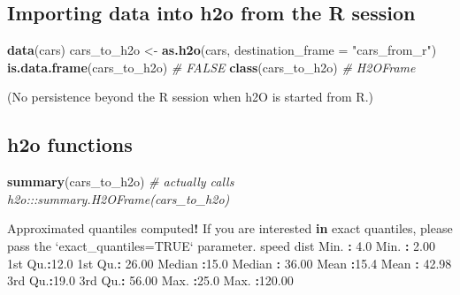 \documentclass[]{book}
\newenvironment{Shaded}{\begin{snugshade}}{\end{snugshade}}
\newcommand{\KeywordTok}[1]{\textcolor[rgb]{0.13,0.29,0.53}{\textbf{#1}}}
\newcommand{\DataTypeTok}[1]{\textcolor[rgb]{0.13,0.29,0.53}{#1}}
\newcommand{\FloatTok}[1]{\textcolor[rgb]{0.00,0.00,0.81}{#1}}
\newcommand{\StringTok}[1]{\textcolor[rgb]{0.31,0.60,0.02}{#1}}
\newcommand{\CommentTok}[1]{\textcolor[rgb]{0.56,0.35,0.01}{\textit{#1}}}
\newcommand{\ControlFlowTok}[1]{\textcolor[rgb]{0.13,0.29,0.53}{\textbf{#1}}}
\newcommand{\OperatorTok}[1]{\textcolor[rgb]{0.81,0.36,0.00}{\textbf{#1}}}
\newcommand{\NormalTok}[1]{#1}
\theoremstyle{definition}
\theoremstyle{definition}
\theoremstyle{definition}
\theoremstyle{remark}
\begin{document}
\subsection{Importing data into h2o from the R
session}\label{importing-data-into-h2o-from-the-r-session}

\begin{Shaded}
\begin{Highlighting}[]
\KeywordTok{data}\NormalTok{(cars)}
\NormalTok{cars_to_h2o <-}\StringTok{ }\KeywordTok{as.h2o}\NormalTok{(cars, }\DataTypeTok{destination_frame =} \StringTok{"cars_from_r"}\NormalTok{)}
\KeywordTok{is.data.frame}\NormalTok{(cars_to_h2o) }\CommentTok{# FALSE}
\KeywordTok{class}\NormalTok{(cars_to_h2o) }\CommentTok{# H2OFrame}
\end{Highlighting}
\end{Shaded}

(No persistence beyond the R session when h2O is started from R.)

\subsection{h2o functions}\label{h2o-functions}

\begin{Shaded}
\begin{Highlighting}[]
\KeywordTok{summary}\NormalTok{(cars_to_h2o) }\CommentTok{# actually calls h2o:::summary.H2OFrame(cars_to_h2o)}
\end{Highlighting}
\end{Shaded}

\begin{Shaded}
\begin{Highlighting}[]
\NormalTok{Approximated quantiles computed}\OperatorTok{!}\StringTok{ }\NormalTok{If you are interested }\ControlFlowTok{in}\NormalTok{ exact quantiles, please pass the }\StringTok{`}\DataTypeTok{exact_quantiles=TRUE}\StringTok{`}\NormalTok{ parameter. speed          dist            }
\NormalTok{ Min.   }\OperatorTok{:}\StringTok{ }\FloatTok{4.0}\NormalTok{   Min.   }\OperatorTok{:}\StringTok{  }\FloatTok{2.00}  
\NormalTok{ 1st Qu.}\OperatorTok{:}\FloatTok{12.0}\NormalTok{   1st Qu.}\OperatorTok{:}\StringTok{ }\FloatTok{26.00}  
\NormalTok{ Median }\OperatorTok{:}\FloatTok{15.0}\NormalTok{   Median }\OperatorTok{:}\StringTok{ }\FloatTok{36.00}  
\NormalTok{ Mean   }\OperatorTok{:}\FloatTok{15.4}\NormalTok{   Mean   }\OperatorTok{:}\StringTok{ }\FloatTok{42.98}  
\NormalTok{ 3rd Qu.}\OperatorTok{:}\FloatTok{19.0}\NormalTok{   3rd Qu.}\OperatorTok{:}\StringTok{ }\FloatTok{56.00}  
\NormalTok{ Max.   }\OperatorTok{:}\FloatTok{25.0}\NormalTok{   Max.   }\OperatorTok{:}\FloatTok{120.00}  
\end{Highlighting}
\end{Shaded}
\end{document}
